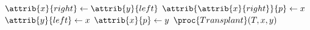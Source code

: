 \begin{codebox}
\li $\attrib{x}{right} \gets \attrib{y}{left}$
\li $\attrib{\attrib{x}{right}}{p} \gets x$
\li $\attrib{y}{left} \gets x$
\li $\attrib{x}{p} \gets y$
\li $\proc{Transplant}(T,x,y)$
\end{codebox}